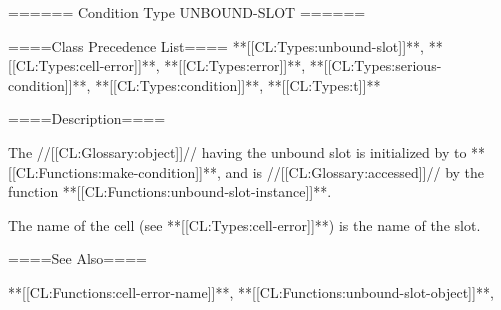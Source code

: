 ====== Condition Type UNBOUND-SLOT ======

====Class Precedence List==== **[[CL:Types:unbound-slot]]**, **[[CL:Types:cell-error]]**, **[[CL:Types:error]]**, **[[CL:Types:serious-condition]]**, **[[CL:Types:condition]]**, **[[CL:Types:t]]**

====Description====

The //[[CL:Glossary:object]]// having the unbound slot is initialized by  to **[[CL:Functions:make-condition]]**, and is //[[CL:Glossary:accessed]]// by the function **[[CL:Functions:unbound-slot-instance]]**.

The name of the cell (see **[[CL:Types:cell-error]]**) is the name of the slot.

====See Also====

**[[CL:Functions:cell-error-name]]**, **[[CL:Functions:unbound-slot-object]]**, {\secref\ConditionSystemConcepts}

